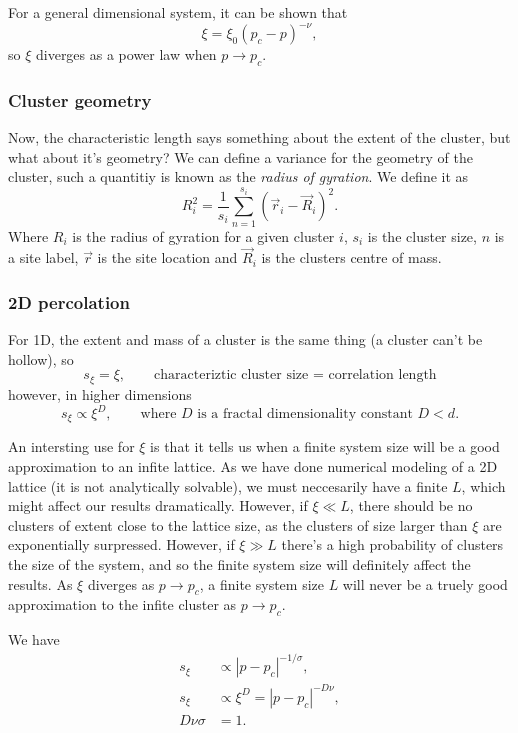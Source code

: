 \documentclass[a4paper, 11pt, notitlepage, english]{article}
\begin{document}
For a general dimensional system, it can be shown that
$$\xi = \xi_0(p_c - p)^{-\nu},$$
so $\xi$ diverges as a power law when $p \to p_c$.

\subsubsection*{Cluster geometry}

Now, the characteristic length says something about the extent of the cluster, but what about it's geometry? We can define a variance for the geometry of the cluster, such a quantitiy is known as the \emph{radius of gyration}. We define it as
$$R_i^2 = \frac{1}{s_i}\sum_{n=1}^{s_i} (\vec{r}_i - \vec{R}_i)^2.$$
Where $R_i$ is the radius of gyration for a given cluster $i$, $s_i$ is the cluster size, $n$ is a site label, $\vec{r}$ is the site location and $\vec{R}_i$ is the clusters centre of mass.

\subsubsection*{2D percolation}
For 1D, the extent and mass of a cluster is the same thing (a cluster can't be hollow), so 
$$s_\xi = \xi, \qquad \mbox{characteriztic cluster size = correlation length}$$
however, in higher dimensions
$$s_\xi \propto \xi^D, \qquad \mbox{where } D \mbox{ is a fractal dimensionality constant } D < d.$$


An intersting use for $\xi$ is that it tells us when a finite system size will be a good approximation to an infite lattice. As we have done numerical modeling of a 2D lattice (it is not analytically solvable), we must neccesarily have a finite $L$, which might affect our results dramatically. However, if $\xi \ll L$, there should be no clusters of extent close to the lattice size, as the clusters of size larger than $\xi$ are exponentially surpressed. However, if $\xi \gg L$ there's a high probability of clusters the size of the system, and so the finite system size will definitely affect the results. As $\xi$ diverges as $p\to p_c$, a finite system size $L$ will never be a truely good approximation to the infite cluster as $p \to p_c$. 

We have
\begin{align*}
s_\xi &\propto |p-p_c|^{-1/\sigma}, \\
s_\xi &\propto \xi^D = |p-p_c|^{-D\nu}, \\
D\nu\sigma &= 1.
\end{align*}
\end{document}
